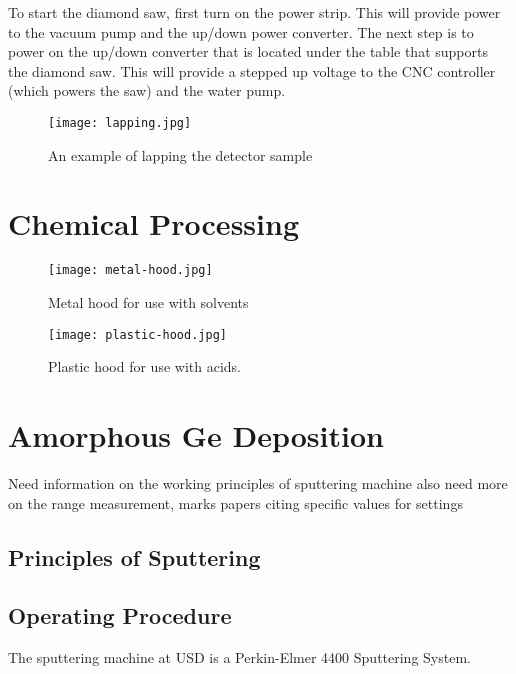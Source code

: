 To start the diamond saw, first turn on the power strip.
This will provide power to the vacuum pump and the up/down power converter.
The next step is to power on the up/down converter that is located under the table that supports the diamond saw.
This will provide a stepped up voltage to the CNC controller (which powers the saw) and the water pump.
\begin{figure}[htpb]
\centering
\texttt{[image: lapping.jpg]}
\caption{An example of lapping the detector sample}
\label{fig:lapping}
\end{figure}%
\section{Chemical Processing}

\begin{figure}[htpb]
\centering
\texttt{[image: metal-hood.jpg]}
\caption{Metal hood for use with solvents}
\label{fig:metalhood}
\end{figure}


\begin{figure}[htpb]
\centering
\texttt{[image: plastic-hood.jpg]}
\caption{Plastic hood for use with acids.}
\label{fig:plastichood}
\end{figure}

\section{Amorphous Ge Deposition}

Need information on the working principles of sputtering machine
also need more on the range measurement, marks papers citing specific values for settings 
\subsection{Principles of Sputtering}

\subsection{Operating Procedure}
The sputtering machine at USD is a Perkin-Elmer 4400 Sputtering System.

